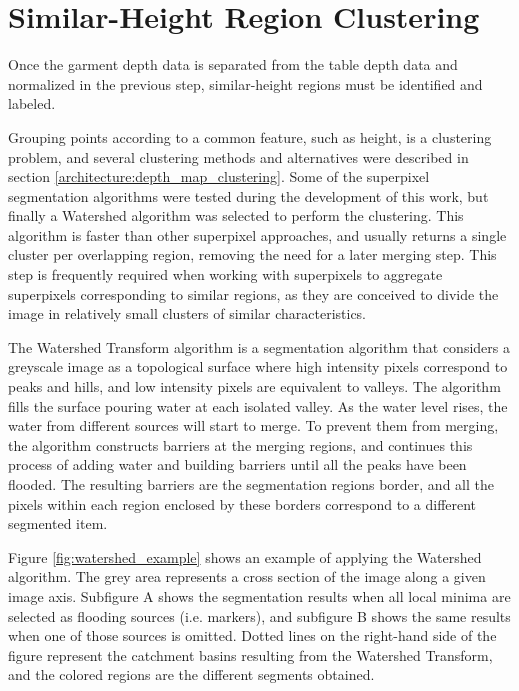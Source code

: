 \section{Similar-Height Region Clustering}
\label{garment_clustering_watershed}

Once the garment depth data is separated from the table depth data and normalized in the previous step, similar-height regions must be identified and labeled.

Grouping points according to a common feature, such as height, is a clustering problem, and several clustering methods and alternatives were described in section \ref{architecture:depth_map_clustering}. Some of the superpixel segmentation algorithms were tested during the development of this work, but finally a Watershed \cite{digabel1978iterative} algorithm was selected to perform the clustering. This algorithm is faster than other superpixel approaches, and usually returns a single cluster per overlapping region, removing the need for a later merging step. This step is frequently required when working with superpixels to aggregate superpixels corresponding to similar regions, as they are conceived to divide the image in relatively small clusters of similar characteristics.

The Watershed Transform algorithm is a segmentation algorithm that considers a greyscale image as a topological surface where high intensity pixels correspond to peaks and hills, and low intensity pixels are equivalent to valleys. The algorithm fills the surface pouring water at each isolated valley. As the water level rises, the water from different sources will start to merge. To prevent them from merging, the algorithm constructs barriers at the merging regions, and continues this process of adding water and building barriers until all the peaks have been flooded. The resulting barriers are the segmentation regions border, and all the pixels within each region enclosed  by these borders correspond to a different segmented item. 

Figure \ref{fig:watershed_example} shows an example of applying the Watershed algorithm. The grey area represents a cross section of the image along a given image axis. Subfigure A shows the segmentation results when all local minima are selected as flooding sources (i.e. markers), and subfigure B shows the same results when one of those sources is omitted. Dotted lines on the right-hand side of the figure represent the catchment basins resulting from the Watershed Transform, and the colored regions are the different segments obtained.

